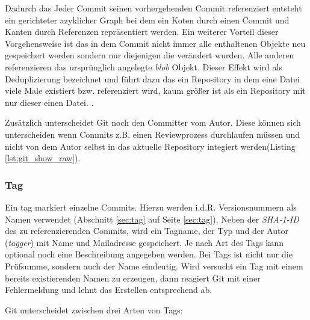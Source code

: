 Dadurch das Jeder Commit seinen vorhergehenden Commit referenziert entsteht ein
gerichteter azyklicher Graph bei dem ein Koten durch einen Commit und Kanten
durch Referenzen repräsentiert werden. Ein weiterer Vorteil dieser
Vorgehensweise ist das in dem Commit nicht immer alle enthaltenen Objekte neu
gespeichert werden sondern nur diejenigen die verändert wurden. Alle anderen
referenzieren das ursprünglich angelegte \textit{blob} Objekt. Dieser Effekt
wird als Deduplizierung bezeichnet und führt dazu das ein Repository in dem
eine Datei viele Male existiert bzw. referenziert wird, kaum größer ist als ein
Repository mit nur dieser einen Datei.
\cite[56-57]{gitosp}.



Zusätzlich unterscheidet Git noch den Committer vom Autor. Diese können sich
unterscheiden wenn Commits z.B. einen Reviewprozess durchlaufen müssen und
nicht von dem Autor selbst in das aktuelle Repository integiert werden(Listing
\ref{lst:git_show_raw}).

\subsubsection{Tag}\label{sec:tagobject}
Ein \gls{tag} markiert einzelne Commits. Hierzu werden i.d.R. Versionsnummern
als Namen verwendet (Abschnitt \ref{sec:tag} auf Seite \ref{sec:tag}). Neben
der \textit{SHA-1-ID} des zu referenzierenden Commits, wird ein Tagname, der
Typ und der Autor (\textit{tagger}) mit Name und Mailadresse gespeichert. Je
nach Art des Tags kann optional noch eine Beschreibung angegeben werden. Bei
Tags ist nicht nur die Prüfsumme, sondern auch der Name eindeutig. Wird
versucht ein Tag mit einem bereits existierenden Namen zu erzeugen, dann
reagiert Git mit einer Fehlermeldung und lehnt das Erstellen entsprechend ab.

Git unterscheidet zwischen drei Arten von Tags:

